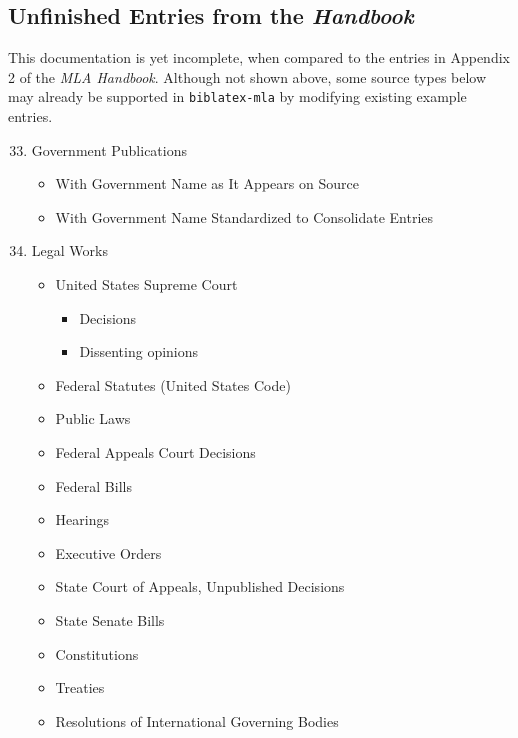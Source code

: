 \documentclass{ltxdockit}
\begin{document}
\subsection{Unfinished Entries from the \emph{Handbook}} %
\label{sec:remaining_sections}

This documentation is yet incomplete, when compared to the entries in Appendix 2 of the \emph{MLA Handbook}. Although not shown above, some source types below may already be supported in \texttt{biblatex-mla} by modifying existing example entries.

\begin{multicols}{2}
\begin{enumerate}
	
	\setcounter{enumi}{32}
	\item Government Publications
	\begin{itemize}
		\item With Government Name as It Appears on Source
		\item With Government Name Standardized to Consolidate Entries
	\end{itemize}
	
	\item Legal Works
	\begin{itemize}
		\item United States Supreme Court
		\begin{itemize}
			\item Decisions
			\item Dissenting opinions
		\end{itemize}
		\item Federal Statutes (United States Code)
		\item Public Laws
		\item Federal Appeals Court Decisions
		\item Federal Bills
		\item Hearings
		\item Executive Orders
		\item State Court of Appeals, Unpublished Decisions
		\item State Senate Bills
		\item Constitutions
		\item Treaties
		\item Resolutions of International Governing Bodies
	\end{itemize}
	
\end{enumerate}
\end{multicols}
\end{document}
